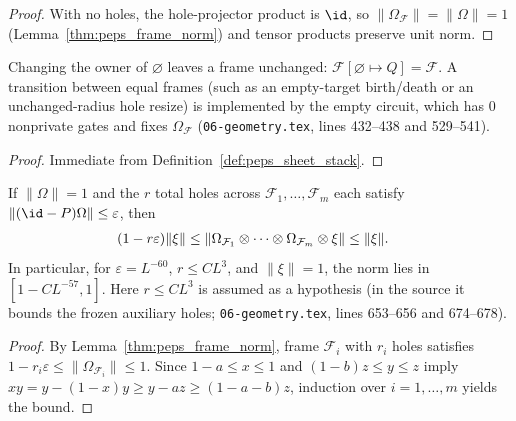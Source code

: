 \begin{proof}\leanok
    With no holes, the hole-projector product is $\id$, so $\lVert\Omega_{\mathcal F}\rVert=\lVert\Omega\rVert=1$ (Lemma~\ref{thm:peps_frame_norm}) and tensor products preserve unit norm.
\end{proof}

\begin{lemma}
    \label{thm:peps_identity_change}
    \leanok
    Changing the owner of $\varnothing$ leaves a frame unchanged: $\mathcal F[\varnothing\mapsto Q]=\mathcal F$. A transition between equal frames (such as an empty-target birth/death or an unchanged-radius hole resize) is implemented by the empty circuit, which has $0$ nonprivate gates and fixes $\Omega_{\mathcal F}$ (\texttt{06-geometry.tex}, lines 432--438 and 529--541).
\end{lemma}

\begin{proof}\leanok
    Immediate from Definition~\ref{def:peps_sheet_stack}.
\end{proof}

\begin{lemma}
    \label{thm:peps_sheet_stack_norm}
    \leanok
    If $\lVert\Omega\rVert=1$ and the $r$ total holes across $\mathcal F_1,\dots,\mathcal F_m$ each satisfy $\lVert(\id-P)\Omega\rVert\le\varepsilon$, then
    \begin{align}
        (1-r\varepsilon)\lVert\xi\rVert
         & \le\lVert\Omega_{\mathcal F_1}\otimes\cdots\otimes
        \Omega_{\mathcal F_m}\otimes\xi\rVert\le\lVert\xi\rVert. \notag
    \end{align}
    In particular, for $\varepsilon=L^{-60}$, $r\le CL^3$, and $\lVert\xi\rVert=1$, the norm lies in $[1-CL^{-57},1]$. Here $r\le CL^3$ is assumed as a hypothesis (in the source it bounds the frozen auxiliary holes; \texttt{06-geometry.tex}, lines 653--656 and 674--678).
\end{lemma}

\begin{proof}\leanok
    By Lemma~\ref{thm:peps_frame_norm}, frame $\mathcal F_i$ with $r_i$ holes satisfies $1-r_i\varepsilon\le\lVert\Omega_{\mathcal F_i}\rVert\le1$. Since $1-a\le x\le1$ and $(1-b)z\le y\le z$ imply $xy=y-(1-x)y\ge y-az\ge(1-a-b)z$, induction over $i=1,\dots,m$ yields the bound.
\end{proof}

